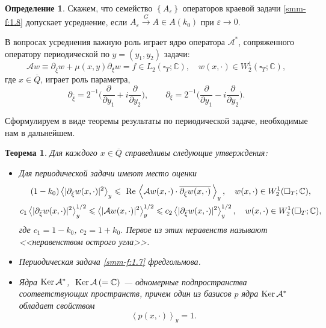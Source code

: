 \documentclass[a4paper,12pt]{article}
\newtheorem{theorem}{Теорема}[section]
\theoremstyle{definition}
\newtheorem{definition}{Определение}[section]
\begin{document}
\begin{definition}
	Скажем, что семейство $\left\{ A_\varepsilon \right\}$ операторов
краевой задачи \eqref{smm-f:1.8}  допускает усреднение, если $A_\varepsilon \overset{G}{\longrightarrow}A\in A(k_0) $ при
$\varepsilon\to 0$.
\end{definition}

	В вопросах усреднения важную роль играет ядро оператора $\mathcal{A}^*$, сопряженного оператору периодической по $y=(y_1,y_2)$ задачи:
	\begin{equation}\label{smm-f:1.7}
		\mathcal{A}w\equiv \partial_{\overline{\xi}}w +\mu(x,y) \partial_{\xi}w =f\in L_2(\square_T;\mathbb{C}),\quad
		w(x,\cdot)\in W_2^1(\square_T;\mathbb{C}),
	\end{equation}
	где $x\in \overline Q$, играет роль параметра,
	$$
	\partial_{\bar \xi}=2^{-1}\Big(\frac{\partial}{\partial y_1}+i\frac{\partial}{\partial y_2}\Big),\qquad  \partial_{\xi}=2^{-1}\Big(\frac{\partial}{\partial y_1}-i\frac{\partial}{\partial y_2}\Big).
	$$
	
	Сформулируем в виде теоремы результаты по периодической задаче, необходимые нам в дальнейшем.
	
	
\begin{theorem}\label{smm-th1.2}
Для каждого $x\in\overline Q$ справедливы следующие утверждения:
\begin{itemize}
\item  Для периодической задачи имеют место оценки
\begin{gather*}
	(1-k_0)\left<|\partial_{\bar{\xi}}w(x,\cdot)|^2\right>_y\leqslant \text{ Re\,}\left<\mathcal{A}w(x,\cdot)\cdot \overline{\partial_{\bar{\xi}}w(x,\cdot)}\,\right>_y,\quad  w(x,\cdot)\in W_2^1(\square_T;\mathbb{C}),\\
	c_1\left<|\partial_{\bar{\xi}}w(x,\cdot)|^2\right>_y^{1/2}\leqslant
	\left<|\mathcal{A}w(x,\cdot)|^2\right>_y^{1/2}\leqslant c_2\left<|\partial_{\bar{\xi}}w(x,\cdot)|^2\right>_y^{1/2}, \quad  w(x,\cdot)\in W_2^1(\square_T;\mathbb{C}),
\end{gather*}
где $c_1=1-k_0$, $c_2=1+k_0$. Первое из этих неравенств называют <<неравенством острого угла>>.
\item  Периодическая задача \eqref{smm-f:1.7} фредгольмова.
\item Ядра  $\text{Ker\,}\mathcal{A}^\ast$, $\text{ Ker\,}\mathcal{A}\,(=\mathbb{C})$
	--- одномерные подпространства соответствующих пространств,
	причем один из базисов $p$ ядра
	$\text{Ker\,}\mathcal{A}^\ast$ обладает свойством
	\begin{equation}\label{smm-df:1.10}
 \left< p(x,\cdot)\right>_y=1.
	\end{equation}
\end{itemize}
\end{theorem}
\end{document}
